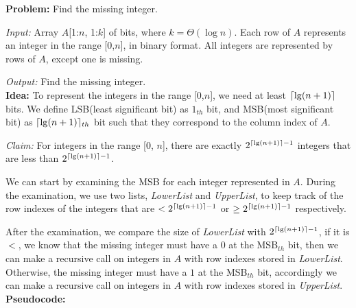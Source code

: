 \documentclass[11pt]{article}
\DeclarePairedDelimiter\ceil{\lceil}{\rceil}
\begin{document}
\begin{enumerate}
\textbf{Problem:} Find the missing integer.

\emph{Input:} Array $A$[1:$n$, 1:$k$] of bits, where $k=\Theta(\log
n)$. Each row of $A$ represents an integer in the range [0,$n$], in
binary format. All integers are represented by rows of $A$, except one
is missing.

\emph{Output:} Find the missing integer.\\

\textbf{Idea:}
To represent the integers in the range [0,$n$], we need at least
$\ceil{\lg (n+1)}$ bits. We define LSB(least significant bit) as
$1_{th}$ bit, and MSB(most significant bit) as $\ceil{\lg (n+1)}_{th}$
bit such that they correspond to the column index of $A$. 

\emph{Claim:} For integers in the range [0, $n$], there are exactly
$2^{\ceil{\lg (n+1)} - 1}$ integers that are less than $2^{\ceil{\lg
    (n+1)} - 1}$.

We can start by examining the MSB for each integer represented in
$A$. During the examination, we use two lists, \emph{LowerList} and
\emph{UpperList}, to keep track of the row indexes of the integers
that are $< 2^{\ceil{\lg (n+1)} - 1}$ or $\geq 2^{\ceil{\lg (n+1)} -
  1}$ respectively. 

After the examination, we compare the size of \emph{LowerList} with
$2^{\ceil{\lg (n+1)} - 1}$, if it is $<$, we know that the missing
integer must have a $0$ at the MSB$_{th}$ bit, then we can make a
recursive call on integers in $A$ with row indexes stored in
\emph{LowerList}. Otherwise, the missing integer must have a $1$ at
the MSB$_{th}$ bit, accordingly we can make a recursive call on
integers in $A$ with row indexes stored in \emph{UpperList}.\\

\textbf{Pseudocode:}


\end{enumerate}
\end{document}
